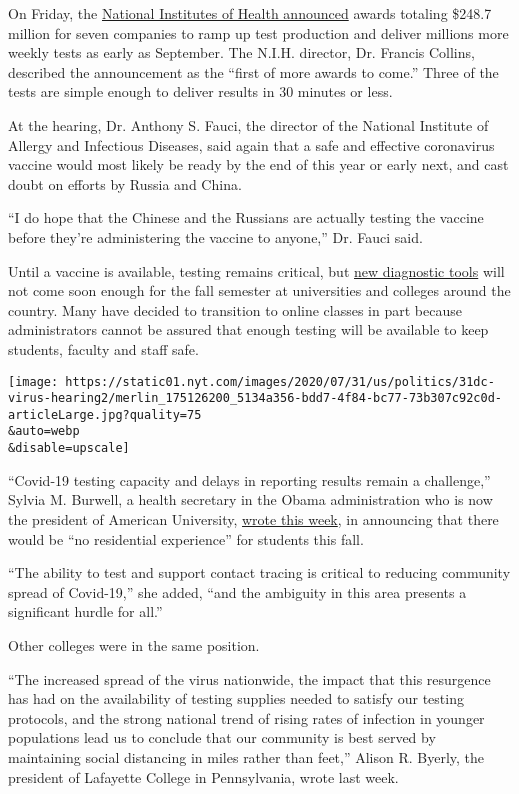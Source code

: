 On Friday, the
\href{https://www.nih.gov/news-events/news-releases/nih-delivering-new-covid-19-testing-technologies-meet-us-demand}{National
Institutes of Health announced} awards totaling \$248.7 million for
seven companies to ramp up test production and deliver millions more
weekly tests as early as September. The N.I.H. director, Dr. Francis
Collins, described the announcement as the ``first of more awards to
come.'' Three of the tests are simple enough to deliver results in 30
minutes or less.

At the hearing, Dr. Anthony S. Fauci, the director of the National
Institute of Allergy and Infectious Diseases, said again that a safe and
effective coronavirus vaccine would most likely be ready by the end of
this year or early next, and cast doubt on efforts by Russia and China.

``I do hope that the Chinese and the Russians are actually testing the
vaccine before they're administering the vaccine to anyone,'' Dr. Fauci
said.

Until a vaccine is available, testing remains critical, but
\href{https://www.nytimes.com/2020/07/06/health/fast-coronavirus-tests.html}{new
diagnostic tools} will not come soon enough for the fall semester at
universities and colleges around the country. Many have decided to
transition to online classes in part because administrators cannot be
assured that enough testing will be available to keep students, faculty
and staff safe.

\texttt{[image: https://static01.nyt.com/images/2020/07/31/us/politics/31dc-virus-hearing2/merlin\_175126200\_5134a356-bdd7-4f84-bc77-73b307c92c0d-articleLarge.jpg?quality=75\\\&auto=webp\\\&disable=upscale]}

``Covid-19 testing capacity and delays in reporting results remain a
challenge,'' Sylvia M. Burwell, a health secretary in the Obama
administration who is now the president of American University,
\href{https://www.american.edu/president/announcements/july-30-2020.cfm}{wrote
this week}, in announcing that there would be ``no residential
experience'' for students this fall.

``The ability to test and support contact tracing is critical to
reducing community spread of Covid-19,'' she added, ``and the ambiguity
in this area presents a significant hurdle for all.''

Other colleges were in the same position.

``The increased spread of the virus nationwide, the impact that this
resurgence has had on the availability of testing supplies needed to
satisfy our testing protocols, and the strong national trend of rising
rates of infection in younger populations lead us to conclude that our
community is best served by maintaining social distancing in miles
rather than feet,'' Alison R. Byerly, the president of Lafayette College
in Pennsylvania, wrote last week.

